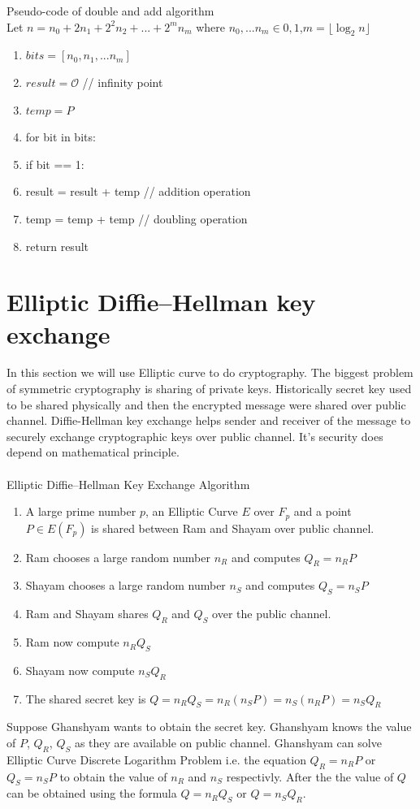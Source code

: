 \documentclass[a4paper,12pt]{report}
\begin{document}
Pseudo-code of double and add algorithm\\
Let $n=n_0+2n_1+2^2n_2+...+2^mn_m$ where $n_0,...n_m \in {0,1}$,$m =\lfloor \log_2 {n} \rfloor$
\begin{enumerate}
	\item $bits = [n_0,n_1,...n_m]$
	\item $result=\mathscr{O}$ \hspace{10mm} //  infinity point
	\item $temp=P$
	\item for bit in bits:
	\item \hspace{10mm}  if bit == 1:
	\item \hspace{10mm} \hspace{10mm}  result = result + temp \hspace{10mm} // addition operation
	\item \hspace{10mm} temp = temp + temp \hspace{10mm}  // doubling operation
	\item return result
\end{enumerate}
\cleardoublepage
\section{Elliptic Diﬃe–Hellman key exchange}
In this section we will use Elliptic curve to do cryptography. The biggest problem of symmetric cryptography is sharing of private keys. Historically secret key used to be shared physically and then the encrypted message were shared over public channel. Diffie-Hellman key exchange helps sender and receiver of the message to securely exchange cryptographic keys over public channel. It's security does depend on mathematical principle. \\\\
Elliptic Diﬃe–Hellman Key Exchange Algorithm
\begin{enumerate}
	\item A large prime number $p$, an Elliptic Curve $E$ over $F_p$ and a point $P \in E(F_p)$  is shared between Ram and Shayam over public channel.
	\item Ram chooses a large random number $n_R$ and computes $Q_R = n_R P$
	\item Shayam chooses a large random number $n_S$ and computes $Q_S = n_S P$
	\item Ram and Shayam shares $Q_R$ and $Q_S$ over the public channel.
	\item Ram now compute $n_R Q_S$
	\item Shayam now compute $n_S Q_R$
	\item The shared secret key is $Q=n_R Q_S=n_R (n_S P)=n_S (n_R P)=n_S Q_R$
\end{enumerate}
Suppose Ghanshyam wants to obtain the secret key. Ghanshyam knows the value of $P$, $Q_R$, $Q_S$ as they are available on public channel. Ghanshyam can solve Elliptic Curve Discrete Logarithm Problem i.e. the equation $Q_R = n_R P$ or $Q_S = n_S P$ to obtain the value of $n_R$ and $n_S$ respectivly. After the the value of $Q$ can be obtained using the formula $Q=n_R Q_S$ or $Q=n_S Q_R$. 


\end{document}
